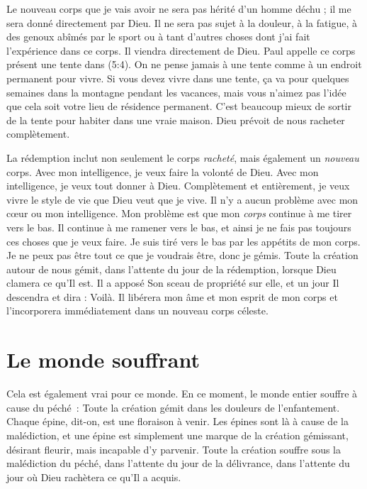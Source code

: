 Le nouveau corps que je vais avoir ne sera pas hérité d'un homme déchu ;
 il me sera donné directement par Dieu.
 Il ne sera pas sujet à la douleur, à la fatigue, à des genoux abîmés
 par le sport ou à tant d'autres choses dont j'ai fait l'expérience
 dans ce corps. Il viendra directement de Dieu.
 Paul appelle ce corps présent une \og tente \fg{} dans (5:4).
 On ne pense jamais à une tente comme à un endroit permanent pour vivre.
 Si vous devez vivre dans une tente, ça va pour quelques semaines
 dans la montagne pendant les vacances, mais vous n'aimez pas l'idée
 que cela soit votre lieu de résidence permanent.
 C'est beaucoup mieux de sortir de la tente pour habiter dans une vraie maison.
 Dieu prévoit de nous racheter complètement.

La rédemption inclut non seulement le corps \emph{racheté}, mais également
 un \emph{nouveau} corps. Avec mon intelligence, je veux faire la volonté de Dieu.
 Avec mon intelligence, je veux tout donner à Dieu.
 Complètement et entièrement, je veux vivre le style de vie que Dieu
 veut que je vive. Il n'y a aucun problème avec mon cœur ou mon intelligence.
 Mon problème est que mon \emph{corps} continue à me tirer vers le bas.
 Il continue à me ramener vers le bas, et ainsi je ne fais pas toujours
 ces choses que je veux faire. Je suis tiré vers le bas par les appétits
 de mon corps. Je ne peux pas être tout ce que je voudrais être,
 donc je gémis. Toute la création autour de nous gémit,
 dans l'attente du jour de la rédemption, lorsque Dieu clamera ce qu'Il est.
 Il a apposé Son sceau de propriété sur elle, et un jour Il descendra
 et dira : \og Voilà. \fg{}
 Il libérera mon âme et mon esprit de mon corps et l'incorporera
 immédiatement dans un nouveau corps céleste.


\section*{Le monde souffrant}

Cela est également vrai pour ce monde.
 En ce moment, le monde entier souffre à cause du péché~:
 \og Toute la création gémit dans les douleurs de l'enfantement. \fg{}
 Chaque épine, dit-on, est une floraison à venir.
 Les épines sont là à cause de la malédiction, et une épine est simplement
 une marque de la création gémissant, désirant fleurir, mais incapable
 d'y parvenir. Toute la création souffre sous la malédiction du péché,
 dans l'attente du jour de la délivrance, dans l'attente du jour
 où Dieu rachètera ce qu'Il a acquis.

